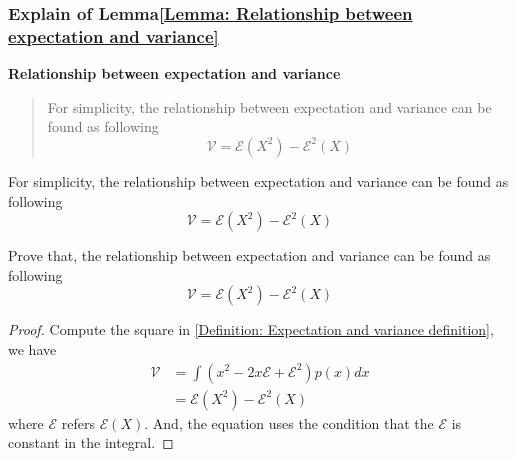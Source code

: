 \documentclass[../concepts.tex]{subfiles}
\begin{document}
\subsubsection{Explain of Lemma\ref{Lemma: Relationship between expectation and variance}}
\textbf{Relationship between expectation and variance}
\begin{quote}
    For simplicity, the relationship between expectation and variance can be found as following
    \begin{equation*}
        \mathcal{V} = \mathcal{E}(X^2) - \mathcal{E}^2(X)
    \end{equation*}
\end{quote}


For simplicity, the relationship between expectation and variance can be found as following
\begin{equation*}
    \mathcal{V} = \mathcal{E}(X^2) - \mathcal{E}^2(X)
\end{equation*}


Prove that, the relationship between expectation and variance can be found as following
\begin{equation*}
    \mathcal{V} = \mathcal{E}(X^2) - \mathcal{E}^2(X)
\end{equation*}

\begin{proof}
    Compute the square in \eqref{Definition: Expectation and variance definition},
    we have
    \begin{align*}
        \mathcal{V} & = \int (x^2 - 2 x \mathcal{E} + \mathcal{E}^2) p(x) dx \\
                    & = \mathcal{E}(X^2) - \mathcal{E}^2(X)
    \end{align*}
    where $\mathcal{E}$ refers $\mathcal{E}(X)$.
    And, the equation uses the condition that the $\mathcal{E}$ is constant in the integral.
\end{proof}
\end{document}
